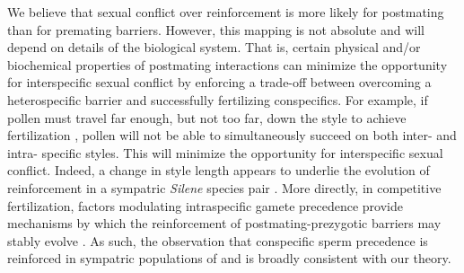 \documentclass[11pt]{article}
\begin{document}
We believe that sexual conflict over reinforcement is more likely for postmating than for premating barriers. 
However, this mapping is not absolute and will depend on details of the biological system.   
That is, certain physical and/or biochemical properties of postmating interactions can minimize the opportunity for interspecific sexual conflict by enforcing a trade-off between overcoming a heterospecific barrier and successfully fertilizing conspecifics.    
For example, if pollen must travel far enough, but not too far, down the style to achieve fertilization \citep[as observed in interspecific crosses in Nicotiana ][]{Lee2008}, pollen will not be able to simultaneously succeed on both inter- and intra- specific styles.
This will minimize the opportunity for interspecific sexual conflict.  
Indeed, a change in style length appears to underlie the evolution of reinforcement in a sympatric \textit{Silene} species pair \citep{Nista2015}.  
More directly, in competitive fertilization, factors modulating intraspecific gamete precedence provide mechanisms by which the reinforcement of postmating-prezygotic barriers may stably evolve \citep{Howard199,Lorch2007}.   
As such, the observation that conspecific sperm precedence is reinforced in sympatric populations of \citep{Drosophila pseudoobscura}  and \citep{D. persimilis} \citep{Castillo_biorXiv} is broadly consistent with our theory.  




\end{document}
